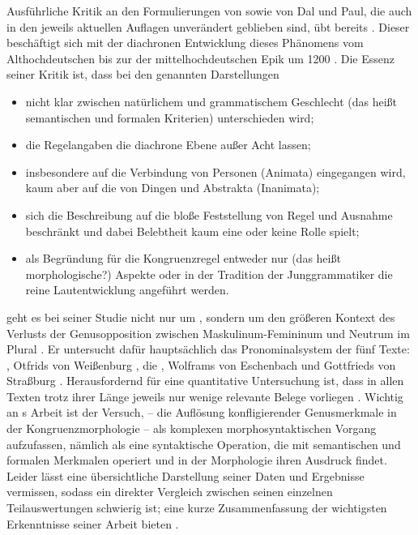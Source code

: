 Ausführliche Kritik an den Formulierungen von
\citet{grimm1890,grimm1898,behaghel1928} sowie von Dal\nocite{dal2014} und
Paul\nocite{paul2007}, die auch in den jeweils aktuellen Auflagen
\autocite{dal2014,paul2007} unverändert geblieben sind, übt bereits
\citet[11--15, 195--213]{askedal1973}. Dieser beschäftigt sich mit der
diachronen Entwicklung dieses Phänomens vom Althochdeutschen bis zur
 der mittelhochdeutschen Epik um 1200
\autocites[vgl.][317]{schneidermohr2001}[dazu auch][3--29]{johnson1999}. Die
Essenz seiner Kritik ist, dass bei den genannten Darstellungen

\begin{itemize}
	\item nicht klar zwischen natürlichem und grammatischem Geschlecht (das
		heißt semantischen und formalen Kriterien) unterschieden wird;
	\item die Regelangaben die diachrone Ebene außer Acht lassen;
	\item insbesondere auf die Verbindung von Personen (Animata) eingegangen
		wird, kaum aber auf die von Dingen und Abstrakta (Inanimata);
	\item sich die Beschreibung auf die bloße Feststellung von Regel und
		Ausnahme beschränkt und dabei Belebtheit kaum eine oder keine Rolle
		spielt;
	\item als Begründung für die Kongruenzregel entweder nur 
		(das heißt morphologische?) Aspekte oder in der Tradition der
		Junggrammatiker die reine Lautentwicklung angeführt werden.
\end{itemize}

\citet{askedal1973} geht es bei seiner Studie nicht nur um
, sondern um den größeren Kontext des Verlusts der Genusopposition
zwischen Maskulinum-Femininum und Neutrum im Plural
\autocite[169--177]{askedal1973}. Er untersucht dafür hauptsächlich das
Pronominalsystem der fünf Texte: , Otfrids von Weißenburg
, die , Wolframs von Eschenbach
 und Gottfrieds von Straßburg .
Herausfordernd für eine quantitative Untersuchung ist, dass in allen Texten
trotz ihrer Länge jeweils nur wenige relevante Belege vorliegen
\autocites[187]{askedal1973}[118]{fleischerschallert2011}. Wichtig an
\citeauthor{askedal1973}s Arbeit ist der Versuch,  -- die
Auflösung konfligierender Genusmerkmale in der Kongruenz\-morphologie
\autocites(siehe \cref{sec:gendres}){corbett1983} -- als komplexen
morphosyntaktischen Vorgang aufzufassen, nämlich als eine syntaktische
Operation, die mit semantischen und formalen Merkmalen operiert und in der
Morphologie ihren Ausdruck findet. Leider lässt \citet{askedal1973} eine
übersichtliche Darstellung seiner Daten und Ergebnisse vermissen, sodass ein
direkter Vergleich zwischen seinen einzelnen Teilauswertungen schwierig ist;
eine kurze Zusammenfassung der wichtigsten Erkenntnisse seiner Arbeit bieten
\citet[118--119]{fleischerschallert2011}.

